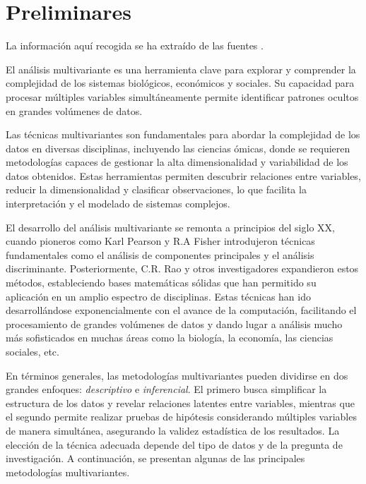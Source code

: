 \section{Preliminares}

La información aquí recogida se ha extraído de las fuentes \cite{hist-mul-1,hist-mul-2, Bib-1}. \newline %

El análisis multivariante es una herramienta clave para explorar y comprender la complejidad de los sistemas 
biológicos, económicos y sociales. Su capacidad para procesar múltiples variables simultáneamente permite identificar 
patrones ocultos en grandes volúmenes de datos. \newline

Las técnicas multivariantes son fundamentales para abordar la complejidad de los datos en diversas disciplinas, 
incluyendo las ciencias ómicas, donde se requieren metodologías capaces de gestionar la alta dimensionalidad y 
variabilidad de los datos obtenidos. Estas herramientas permiten descubrir relaciones entre variables, 
reducir la dimensionalidad y clasificar observaciones, lo que facilita la interpretación y el modelado de sistemas 
complejos. \newline



El desarrollo del análisis multivariante se remonta a principios del siglo XX, cuando pioneros como Karl Pearson y R.A
Fisher introdujeron técnicas fundamentales como el análisis de componentes principales y el análisis discriminante.
Posteriormente, C.R. Rao y otros investigadores expandieron estos métodos, estableciendo bases matemáticas sólidas que
han permitido su aplicación en un amplio espectro de disciplinas. Estas técnicas han ido desarrollándose exponencialmente
con el avance de la computación, facilitando el procesamiento de grandes volúmenes de datos y dando lugar a análisis 
mucho más sofisticados en muchas áreas como la biología, la economía, las ciencias sociales, etc. \newline

En términos generales, las metodologías multivariantes pueden dividirse en dos grandes enfoques: \textit{descriptivo}
e \textit{inferencial}. El primero busca simplificar la estructura de los datos y revelar relaciones latentes entre
variables, mientras que el segundo permite realizar pruebas de hipótesis considerando múltiples variables de manera
simultánea, asegurando la validez estadística de los resultados. La elección de la técnica adecuada depende del tipo 
de datos y de la pregunta de investigación. A continuación, se presentan algunas de las principales metodologías multivariantes.

